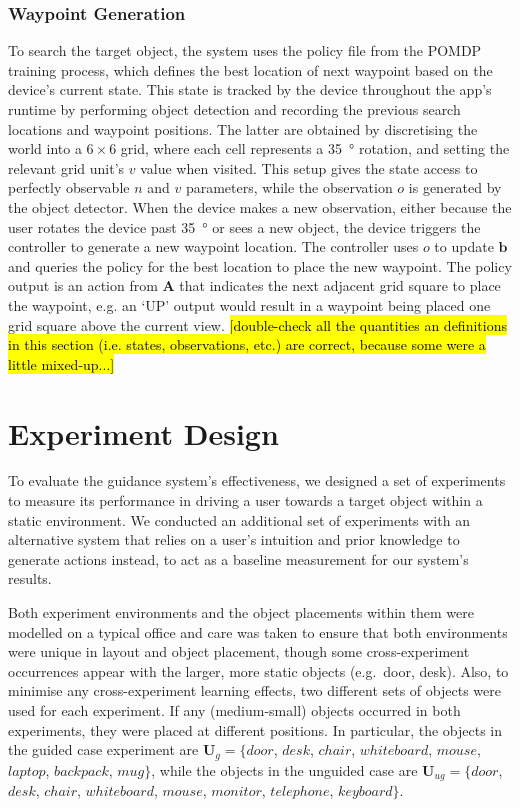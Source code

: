 \documentclass[runningheads]{llncs}
\DeclareRobustCommand{\tofix}[1]{{\sethlcolor{yellow}\hl{[#1]}}}
\begin{document}
\subsubsection{Waypoint Generation}
To search the target object, the system uses the policy file from the POMDP training process, which defines the best location of next waypoint based on the device's current state.
This state is tracked by the device throughout the app's runtime by performing object detection and recording the previous search locations and waypoint positions.
The latter are obtained by discretising the world into a $6\times6$ grid, where each cell represents a \SI{35}{\degree} rotation, and setting the relevant grid unit's $v$ value when visited.
This setup gives the state access to perfectly observable $n$ and $v$ parameters, while the observation $o$ is generated by the object detector. 
When the device makes a new observation, either because the user rotates the device past \SI{35}{\degree} or sees a new object, the device triggers the controller to generate a new waypoint location.
The controller uses $o$ to update $\mathbf{b}$ and queries the policy for the best location to place the new waypoint. 
The policy output is an action from $\mathbf{A}$ that indicates the next adjacent grid square to place the waypoint, e.g. an `UP' output would result in a waypoint being placed one grid square above the current view. 
\tofix{double-check all the quantities an definitions in this section (i.e. states, observations, etc.) are correct, because some were a little mixed-up...}


\section{Experiment Design}\label{sec:experiments}

To evaluate the guidance system's effectiveness, we designed a set of experiments to measure its performance in driving a user towards a target object within a static environment. 
We conducted an additional set of experiments with an alternative system that relies on a user's intuition and prior knowledge to generate actions instead, to act as a baseline measurement for our system's results. 

Both experiment environments and the object placements within them were modelled on a typical office and care was taken to ensure that both environments were unique in layout and object placement, though some cross-experiment occurrences appear with the larger, more static objects (e.g.\ door, desk). 
Also, to minimise any cross-experiment learning effects, two different sets of objects were used for each experiment. If any (medium-small) objects occurred in both experiments, they were placed at different positions. 
In particular, the objects in the guided case experiment are $\mathbf{U}_{g} = \{ door$, $desk$, $chair$, $whiteboard$, $mouse$, $laptop$, $backpack$, $mug \}$, while the objects in the unguided case are $\mathbf{U}_{ug} = \{ door$, $desk$, $chair$, $whiteboard$, $mouse$, $monitor$, $telephone$, $keyboard \}$.
\end{document}
